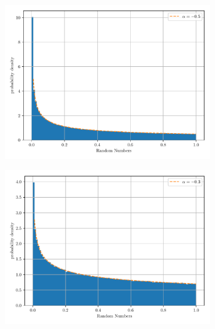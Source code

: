 \documentclass[paper=a4, fontsize=11pt]{scrartcl} %
\numberwithin{equation}{section} %
\numberwithin{figure}{section} %
\numberwithin{table}{section} %
\begin{document}
\begin{figure}[!ht]
	\centering
	\begin{subfigure}[b]{0.495\textwidth}
		\centering
		\includegraphics[width=\linewidth]{figure_3_a.pdf}
		\label{fig:non-uniform_1:a}
	\end{subfigure}
	\begin{subfigure}[b]{0.495\textwidth}
		\centering
		\includegraphics[width=\linewidth]{figure_3_b.pdf}
		\label{fig:non-uniform_1:b}
	\end{subfigure}
	\begin{subfigure}[b]{0.495\textwidth}
		\centering

\end{subfigure}
\end{figure}
\end{document}
